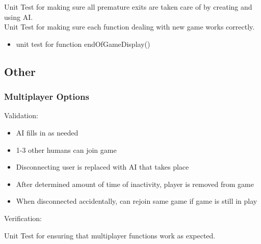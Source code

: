 \documentclass[11pt, titlepage]{article}
\begin{document}
			Unit Test for making sure all premature exits are taken care of by creating and using AI.\\
			Unit Test for making sure each function dealing with new game works correctly.
			\begin{itemize}
				\item unit test for function endOfGameDisplay()			
			\end{itemize}
		\subsection{Other}	
			\subsubsection{Multiplayer Options}
			Validation:
			\begin{itemize}
				\item AI fills in as needed
				\item 1-3 other humans can join game
				\item Disconnecting user is replaced with AI that takes place
				\item After determined amount of time of inactivity, player is removed from game
				\item When disconnected accidentally, can rejoin same game if game is still in play
			\end{itemize}
			Verification:
			
			Unit Test for ensuring that multiplayer functions work as expected.
		
\end{document}
